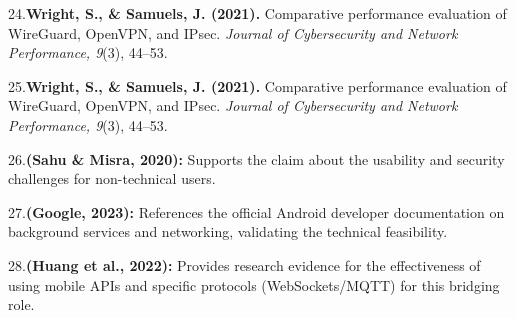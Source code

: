 \documentclass[12pt,a4paper,oneside]{report}
\begin{document}
24.\textbf{Wright, S., \& Samuels, J. (2021). }Comparative performance evaluation of WireGuard, OpenVPN, and IPsec. \textit{Journal of Cybersecurity and Network Performance, 9}(3), 44--53.


25.\textbf{Wright, S., \& Samuels, J. (2021). }Comparative performance evaluation of WireGuard, OpenVPN, and IPsec. \textit{Journal of Cybersecurity and Network Performance, 9}(3), 44--53.


26.\textbf{(Sahu \& Misra, 2020): }Supports the claim about the usability and security challenges for non-technical users.


27.\textbf{(Google, 2023): }References the official Android developer documentation on background services and networking, validating the technical feasibility.


28.\textbf{(Huang et al., 2022): }Provides research evidence for the effectiveness of using mobile APIs and specific protocols (WebSockets/MQTT) for this bridging role.
\end{document}
